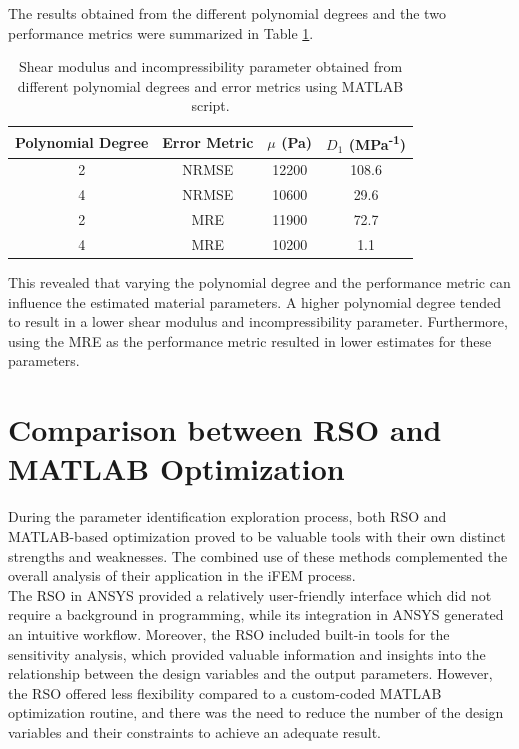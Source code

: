 The results obtained from the different polynomial degrees and the two performance metrics were summarized
in Table \ref{tab:materialsetMATLAB}.
\begin{table}[h!]
	\centering
	\begin{tabular}{|c|c|c|c|}
	\hline
	\textbf{Polynomial Degree} & \textbf{Error Metric} & $\mu$ (Pa) &	$D_1$ (MPa\textsuperscript{-1}) \\
	\hline
	2 & NRMSE & 12200 & 108.6 \\
	4 & NRMSE & 10600 & 29.6 \\
	2 & MRE & 11900 & 72.7 \\
	4 & MRE & 10200 & 1.1 \\
	\hline
	\end{tabular}
	\caption[Material parameter sets obtained from MATLAB]{Shear modulus and incompressibility parameter obtained from different polynomial degrees and error metrics using MATLAB script.}
	\label{tab:materialsetMATLAB}
\end{table}

This revealed that varying the polynomial degree and the performance metric can influence the estimated material parameters. 
A higher polynomial degree tended to result in a lower shear modulus and incompressibility parameter. Furthermore, 
using the MRE as the performance metric resulted in lower estimates for these parameters.\\

\section{Comparison between RSO and MATLAB Optimization}
\label{section:comparisonrsomatlab}

During the parameter identification exploration process, both RSO and MATLAB-based optimization proved to be valuable tools with 
their own distinct strengths and weaknesses. The combined use of these methods complemented the overall analysis of their application in the
iFEM process.\\

The RSO in ANSYS provided a relatively user-friendly interface which did not require a background in programming, while its integration
in ANSYS generated an intuitive workflow. Moreover, the RSO included built-in tools for the sensitivity analysis, which provided 
valuable information and insights into the relationship between the design variables and the output parameters. 
However, the RSO offered less flexibility compared to a custom-coded MATLAB optimization routine, and there was the need to 
reduce the number of the design variables and their constraints to achieve an adequate result.\\


